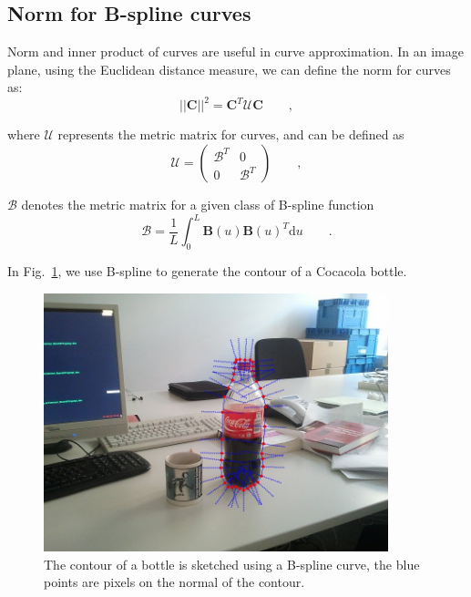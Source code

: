 \subsection{Norm for B-spline curves}
\label{sec:nbc}

Norm and inner product of curves are useful in curve approximation. In
an image plane, using the Euclidean distance measure, we can define the
norm for curves as:
\begin{equation}
  \label{eq:4.13}
  \left| \left| \mathbf{C} \right|\right|^2  = \mathbf{C}^T\mathcal{U}\mathbf{C}\qquad ,
\end{equation}

where $\mathcal{U}$ represents the metric matrix for curves, and can be
defined as 
\begin{equation}
  \label{eq:4.14}
  \mathcal{U} =   \begin{pmatrix}
\mathcal{B}^T & 0 \\
0 &\mathcal{B}^T 
  \end{pmatrix} \qquad , 
\end{equation}

$\mathcal{B}$ denotes the metric matrix for a given class of B-spline
function
\begin{equation}
  \label{eq:4.15}
  \mathcal{B}   = \frac{1}{L} \int_0^L \mathbf{B}(u)\mathbf{B}(u)^T \mathrm{d}u\qquad.
\end{equation}

In Fig.~\ref{fig:bsplinenormal}, we use B-spline to generate the contour of a
Cocacola bottle.
\begin{figure}[htb]
  \centering
  \includegraphics[width=10cm]{images/bsplinenormal.jpg}
  \caption{The contour of a bottle is sketched using a B-spline
    curve, the blue points are pixels on the normal of the contour.}
\label{fig:bsplinenormal}
\end{figure}


